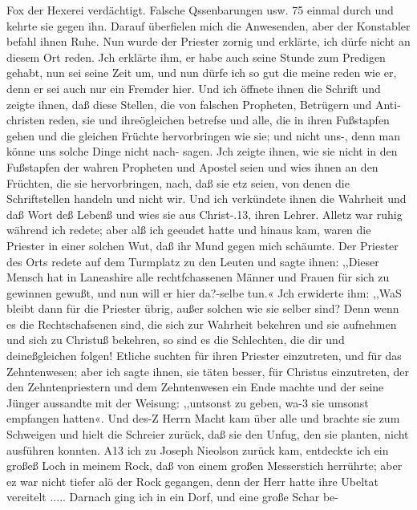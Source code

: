 Fox der Hexerei verdächtigt. Falsche Qssenbarungen usw. 75
einmal durch und kehrte sie gegen ihn. Darauf überfielen mich
die Anwesenden, aber der Konstabler befahl ihnen Ruhe. Nun
wurde der Priester zornig und erklärte, ich dürfe nicht an diesem
Ort reden. Jch erklärte ihm, er habe auch seine Stunde zum
Predigen gehabt, nun sei seine Zeit um, und nun dürfe ich so
gut die meine reden wie er, denn er sei auch nur ein Fremder
hier. Und ich öffnete ihnen die Schrift und zeigte ihnen, daß
diese Stellen, die von falschen Propheten, Betrügern und Anti-
christen reden, sie und ihreögleichen betrefse und alle, die in ihren
Fußstapfen gehen und die gleichen Früchte hervorbringen wie sie;
und nicht uns-, denn man könne uns solche Dinge nicht nach-
sagen. Jch zeigte ihnen, wie sie nicht in den Fußstapfen der
wahren Propheten und Apostel seien und wies ihnen an den
Früchten, die sie hervorbringen, nach, daß sie etz seien, von denen
die Schriftstellen handeln und nicht wir. Und ich verkündete ihnen
die Wahrheit und daß Wort deß Lebenß und wies sie aus Christ-.13,
ihren Lehrer. Alletz war ruhig während ich redete; aber alß ich
geeudet hatte und hinaus kam, waren die Priester in einer solchen
Wut, daß ihr Mund gegen mich schäumte. Der Priester des
Orts redete auf dem Turmplatz zu den Leuten und sagte ihnen:
,,Dieser Mensch hat in Laneashire alle rechtfchassenen Männer
und Frauen für sich zu gewinnen gewußt, und nun will er hier
da?-selbe tun.« Jch erwiderte ihm: ,,WaS bleibt dann für die
Priester übrig, außer solchen wie sie selber sind? Denn wenn es
die Rechtschafsenen sind, die sich zur Wahrheit bekehren und sie
aufnehmen und sich zu Christuß bekehren, so sind es die Schlechten,
die dir und deineßgleichen folgen! Etliche suchten für ihren Priester
einzutreten, und für das Zehntenwesen; aber ich sagte ihnen, sie
täten besser, für Christus einzutreten, der den Zehntenpriestern
und dem Zehntenwesen ein Ende machte und der seine Jünger
aussandte mit der Weisung: ,,untsonst zu geben, wa-3 sie umsonst
empfangen hatten«. Und des-Z Herrn Macht kam über alle und brachte
sie zum Schweigen und hielt die Schreier zurück, daß sie den Unfug,
den sie planten, nicht ausführen konnten. A13 ich zu Joseph
Nieolson zurück kam, entdeckte ich ein großeß Loch in meinem
Rock, daß von einem großen Messerstich herrührte; aber ez war
nicht tiefer alö der Rock gegangen, denn der Herr hatte ihre
Ubeltat vereitelt .....
Darnach ging ich in ein Dorf, und eine große Schar be-


